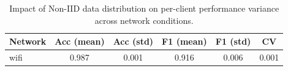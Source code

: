 \begin{table}[t]
\centering
\caption{Impact of Non-IID data distribution on per-client performance variance across network conditions.}
\label{tab:noniid_impact}
\begin{tabular}{lccccc}
\toprule
Network & Acc (mean) & Acc (std) & F1 (mean) & F1 (std) & CV \\
\midrule
wifi & 0.987 & 0.001 & 0.916 & 0.006 & 0.001 \\
\bottomrule
\end{tabular}
\end{table}
